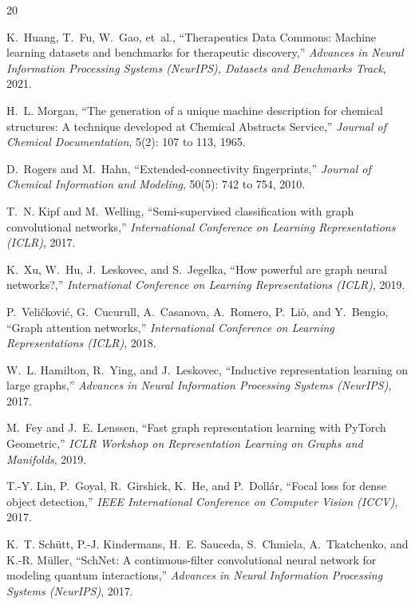 \documentclass[a4paper,11pt]{article}
\begin{document}
\begin{thebibliography}{20}

K.~Huang, T.~Fu, W.~Gao, et~al.,
``Therapeutics Data Commons: Machine learning datasets and benchmarks for therapeutic discovery,''
\textit{Advances in Neural Information Processing Systems (NeurIPS), Datasets and Benchmarks Track}, 2021.

H.~L. Morgan,
``The generation of a unique machine description for chemical structures: A technique developed at Chemical Abstracts Service,''
\textit{Journal of Chemical Documentation}, 5(2): 107 to 113, 1965.

D.~Rogers and M.~Hahn,
``Extended-connectivity fingerprints,''
\textit{Journal of Chemical Information and Modeling}, 50(5): 742 to 754, 2010.

T.~N. Kipf and M.~Welling,
``Semi-supervised classification with graph convolutional networks,''
\textit{International Conference on Learning Representations (ICLR)}, 2017.

K.~Xu, W.~Hu, J.~Leskovec, and S.~Jegelka,
``How powerful are graph neural networks?,''
\textit{International Conference on Learning Representations (ICLR)}, 2019.

P.~Veli\v{c}kovi\'{c}, G.~Cucurull, A.~Casanova, A.~Romero, P.~Li\`{o}, and Y.~Bengio,
``Graph attention networks,''
\textit{International Conference on Learning Representations (ICLR)}, 2018.

W.~L. Hamilton, R.~Ying, and J.~Leskovec,
``Inductive representation learning on large graphs,''
\textit{Advances in Neural Information Processing Systems (NeurIPS)}, 2017.

M.~Fey and J.~E. Lenssen,
``Fast graph representation learning with PyTorch Geometric,''
\textit{ICLR Workshop on Representation Learning on Graphs and Manifolds}, 2019.

T.-Y. Lin, P.~Goyal, R.~Girshick, K.~He, and P.~Doll\'{a}r,
``Focal loss for dense object detection,''
\textit{IEEE International Conference on Computer Vision (ICCV)}, 2017.

K.~T. Sch\"{u}tt, P.-J. Kindermans, H.~E. Sauceda, S.~Chmiela, A.~Tkatchenko, and K.-R. M\"{u}ller,
``SchNet: A continuous-filter convolutional neural network for modeling quantum interactions,''
\textit{Advances in Neural Information Processing Systems (NeurIPS)}, 2017.

\end{thebibliography}
\end{document}
